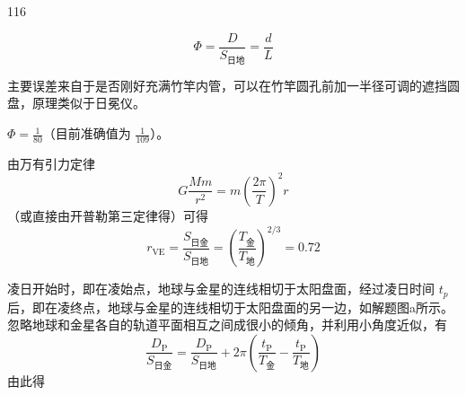\begin{solution}{116}
    \begin{subsolution}
        \begin{subsubsolution}
            \begin{equation}
                \Phi = \frac{D}{S_{\text{日地}}} = \frac{d}{L}
                \label{eq:1.s116}
            \end{equation}
        \end{subsubsolution}
        \begin{subsubsolution}
            主要误差来自于是否刚好充满竹竿内管，可以在竹竿圆孔前加一半径可调的遮挡圆盘，原理类似于日冕仪。
        \end{subsubsolution}
        \begin{subsubsolution}
            $\Phi = \frac{1}{80}$（目前准确值为 $\frac{1}{109}$）。
            \label{eq:2.s116}
        \end{subsubsolution}
    \end{subsolution}
    \begin{subsolution}
        \begin{subsubsolution}
            由万有引力定律
            \begin{equation}
                G \frac{M m}{r^{2}} = m \left(\frac{2\pi}{T}\right)^{2} r
                \label{eq:3.s116}
            \end{equation}
            （或直接由开普勒第三定律得）可得
            \begin{equation}
                r_{\mathrm{VE}} = \frac{S_{\text{日金}}}{S_{\text{日地}}} = \left(\frac{T_{\text{金}}}{T_{\text{地}}}\right)^{2/3} = 0.72
                \label{eq:4.s116}
            \end{equation}
        \end{subsubsolution}
        \begin{subsubsolution}
            凌日开始时，即在凌始点，地球与金星的连线相切于太阳盘面，经过凌日时间 $t_{p}$ 后，即在凌终点，地球与金星的连线相切于太阳盘面的另一边，如解题图a所示。忽略地球和金星各自的轨道平面相互之间成很小的倾角，并利用小角度近似，有
            \begin{equation}
                \frac{D_{\mathrm{P}}}{S_{\text{日金}}} = \frac{D_{\mathrm{P}}}{S_{\text{日地}}} + 2\pi \left(\frac{t_{\mathrm{P}}}{T_{\text{金}}} - \frac{t_{\mathrm{P}}}{T_{\text{地}}}\right)
                \label{eq:5.s116}
            \end{equation}
            由此得
            \begin{equation}

\end{equation}
\end{subsubsolution}
\end{subsolution}
\end{solution}
